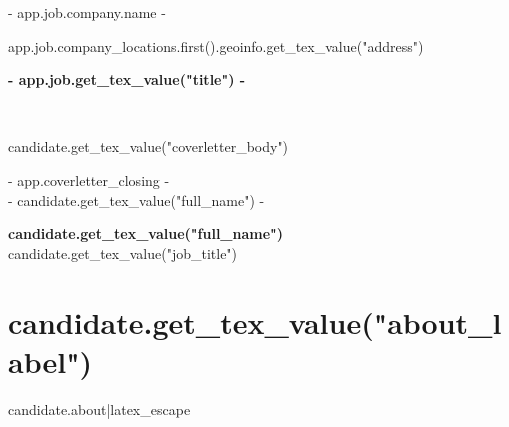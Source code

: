 \documentclass[a4paper, {{- app.cv.latex_pt -}}pt]{report}
\begin{document}
\vspace{10mm}
{%
{{- app.job.company.name -}} \\
{%
{{ app.job.company_locations.first().geoinfo.get_tex_value("address") }}
{%

\begin{center}
\textbf{ {{- app.job.get_tex_value("title") -}} }\\
\vspace{15mm}
\end{center}

\\

\vspace{-3mm}\setlength\parindent{24pt}

{{ candidate.get_tex_value("coverletter_body") }}

\vspace{5mm}

\vspace{10mm}

\begin{flushleft}
{{- app.coverletter_closing -}}\\
{{- candidate.get_tex_value("full_name") -}}\\
\vspace{3mm}

\end{flushleft}

\pagebreak

\begin{center}
  \textbf{\Huge {{ candidate.get_tex_value("full_name") }}} \\
  \vspace{2mm}
   {{ candidate.get_tex_value("job_title") }}
\end{center}

\vspace{4mm}

{%
\space
\section*{ {{ candidate.get_tex_value("about_label") }} }
{{ candidate.about|latex_escape }}
{%

}}}}}
\end{document}
